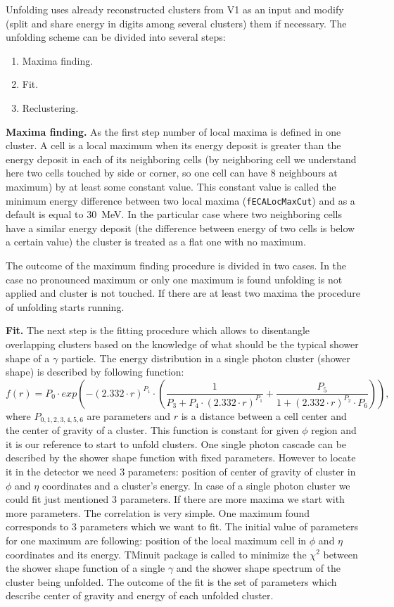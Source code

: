 Unfolding uses already reconstructed clusters from V1 as an input and modify (split and share energy in digits among several clusters) them if necessary. The unfolding scheme can be divided into several steps:
\begin{enumerate}
\item Maxima finding.
\item Fit.
\item Reclustering.
\end{enumerate}
{\bf Maxima finding.} As the first step number of local maxima is defined in one cluster. A cell is a local maximum when its energy deposit is greater than the energy deposit in each of its neighboring cells (by neighboring cell we understand here two cells touched by side or corner, so one cell can have 8 neighbours at maximum) by at least some constant value. This constant value  is called the minimum energy difference between two local maxima (\texttt{fECALocMaxCut}) and as a default is equal to 30~MeV. In the particular case where two neighboring cells have a similar energy deposit (the difference between energy of two cells is below a certain value) the cluster is treated as a flat one with no maximum.

The outcome of the maximum finding procedure is divided in two cases. In the case no pronounced maximum or only one maximum is found unfolding is not applied and cluster is not touched. If there are at least two maxima the procedure of unfolding starts running.

{\bf Fit.} The next step is the fitting procedure which allows to disentangle overlapping clusters based on the knowledge of what should be the typical shower shape of a $\gamma$ particle. The energy distribution in a single photon cluster (shower shape) is described by following function:
\begin{equation}
\label{eq:function}
f(r)=P_0 \cdot exp(- (2.332 \cdot r)^{P_1} \cdot (\frac{1}{P_3 +P_4 \cdot (2.332 \cdot r)^{P_1} } + \frac{P_5}{1+(2.332 \cdot r)^{P_2} \cdot P_6} ) ), 
\end{equation}
where $P_{0,1,2,3,4,5,6}$ are parameters and $r$ is a distance between a cell center and the center of gravity of a cluster. This function is constant for given $\phi$ region and it is our reference to start to unfold clusters. One single photon cascade can be described by the shower shape function with fixed parameters. However to locate it in the detector we need 3 parameters: position of center of gravity of cluster in $\phi$ and $\eta$ coordinates and a cluster's energy. In case of a single photon cluster we could fit just mentioned 3 parameters. If there are more maxima we start with more parameters. The correlation is very simple. One maximum found corresponds to 3 parameters which we want to fit. The initial value of parameters for one maximum are following: position of the local maximum cell in $\phi$ and $\eta$ coordinates and its energy. TMinuit package is called to minimize the $\chi^2$ between the shower shape function of a single $\gamma$ and the shower shape spectrum of the cluster being unfolded. The outcome of the fit is the set of parameters which describe center of gravity and energy of each unfolded cluster.

